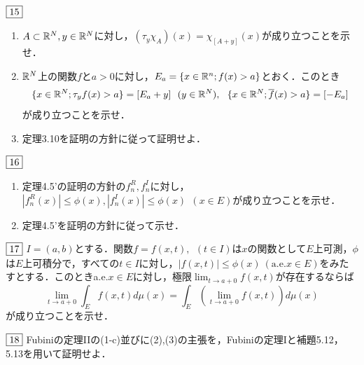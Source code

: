 \documentclass[dvipdfmx, leqno]{jsreport}
\begin{document}
\begin{tcolorbox}$\fbox{15}$
\begin{enumerate}
    \item $A\subset \mathbb{R}^N, y\in \mathbb{R}^N$に対し，$(\tau_y\chi_A)(x)= \chi_{[A+ y]}(x)$が成り立つことを示せ．
    \item $\mathbb{R}^N$上の関数$f$と$a> 0$に対し，$E_a= \{x\in \mathbb{R}^n; f(x)> a\}$とおく．このとき
\begin{equation*}
    \{x\in \mathbb{R}^N; \tau_yf(x)> a\}= [E_a+ y]\ \ (y\in \mathbb{R}^N),\ \ \{x\in \mathbb{R}^N; \overline{f}(x)> a\}= [-E_a]
\end{equation*}
    が成り立つことを示せ．
    \item 定理3.10を証明の方針に従って証明せよ．
\end{enumerate}    
\end{tcolorbox}
\begin{tcolorbox}$\fbox{16}$
\begin{enumerate}
    \item 定理4.5'の証明の方針の$f^R_n, f^I_n$に対し，$|f^R_n(x)|\le \phi(x), |f^I_n(x)|\le \phi(x)\ \ (x\in E)$が成り立つことを示せ．
    \item 定理4.5'を証明の方針に従って示せ．
\end{enumerate}
\end{tcolorbox}
\begin{tcolorbox}$\fbox{17}$
    $I= (a, b)$とする．関数$f= f(x, t),\ \ (t\in I)$は$x$の関数として$E$上可測，$\phi$は$E$上可積分で，すべての$t\in I$に対し，$|f(x, t)|\le \phi(x)\ (\mathrm{a.e.} x\in E)$をみたすとする．このときa.e.$x\in E$に対し，極限$\lim_{t\to a+ 0} f(x, t)$が存在するならば
\begin{equation}
    \lim_{t\to a+ 0} \int_E f(x, t)d\mu(x)= \int_E\left(\lim_{t\to a+ 0} f(x, t)\right)d\mu(x)
\end{equation}
    が成り立つことを示せ．
\end{tcolorbox}
\begin{tcolorbox}$\fbox{18}$
    Fubiniの定理IIの(1-c)並びに(2),(3)の主張を，Fubiniの定理Iと補題5.12，5.13を用いて証明せよ．
\end{tcolorbox}
\end{document}
